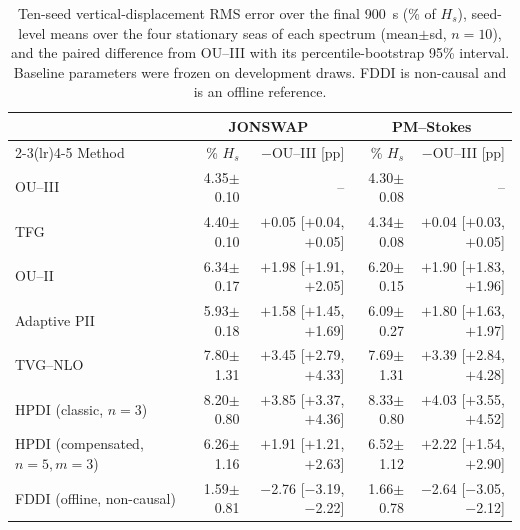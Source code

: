 \begin{table}[t]
\centering
\caption{Ten-seed vertical-displacement RMS error over the final \SI{900}{s} (\% of $H_s$), seed-level means over the four stationary seas of each spectrum (mean$\pm$sd, $n=10$), and the paired difference from OU--III with its percentile-bootstrap 95\% interval. Baseline parameters were frozen on development draws. FDDI is non-causal and is an offline reference.}
\label{tab:conventional-baselines}
\footnotesize
\setlength{\tabcolsep}{2.5pt}
\begin{tabular}{@{}lrrrr@{}}
\toprule
& \multicolumn{2}{c}{JONSWAP} & \multicolumn{2}{c}{PM--Stokes} \\
\cmidrule(lr){2-3}\cmidrule(lr){4-5}
Method & \% $H_s$ & $-$OU--III [pp] & \% $H_s$ & $-$OU--III [pp] \\
\midrule
OU--III & 4.35$\pm$0.10 & -- & 4.30$\pm$0.08 & -- \\
TFG & 4.40$\pm$0.10 & $+$0.05 [$+$0.04, $+$0.05] & 4.34$\pm$0.08 & $+$0.04 [$+$0.03, $+$0.05] \\
OU--II & 6.34$\pm$0.17 & $+$1.98 [$+$1.91, $+$2.05] & 6.20$\pm$0.15 & $+$1.90 [$+$1.83, $+$1.96] \\
Adaptive PII & 5.93$\pm$0.18 & $+$1.58 [$+$1.45, $+$1.69] & 6.09$\pm$0.27 & $+$1.80 [$+$1.63, $+$1.97] \\
TVG--NLO & 7.80$\pm$1.31 & $+$3.45 [$+$2.79, $+$4.33] & 7.69$\pm$1.31 & $+$3.39 [$+$2.84, $+$4.28] \\
HPDI (classic, $n=3$) & 8.20$\pm$0.80 & $+$3.85 [$+$3.37, $+$4.36] & 8.33$\pm$0.80 & $+$4.03 [$+$3.55, $+$4.52] \\
HPDI (compensated, $n=5,m=3$) & 6.26$\pm$1.16 & $+$1.91 [$+$1.21, $+$2.63] & 6.52$\pm$1.12 & $+$2.22 [$+$1.54, $+$2.90] \\
FDDI (offline, non-causal) & 1.59$\pm$0.81 & $-$2.76 [$-$3.19, $-$2.22] & 1.66$\pm$0.78 & $-$2.64 [$-$3.05, $-$2.12] \\
\bottomrule
\end{tabular}
\end{table}
